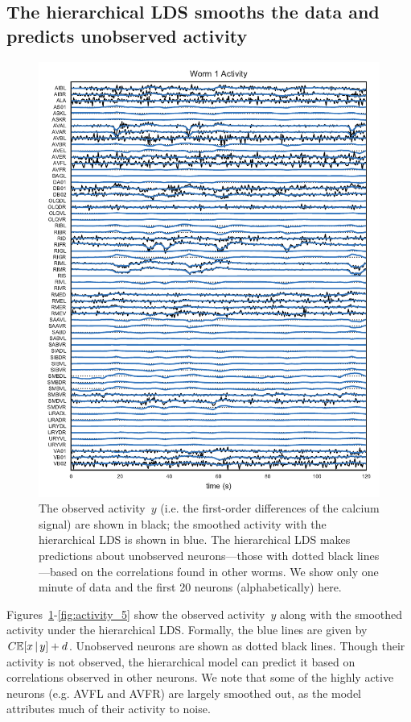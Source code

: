 \documentclass{article}
\begin{document}
\clearpage

\subsection{The hierarchical LDS smooths the data and predicts unobserved activity}


\begin{figure}[h]
  \centering
  \includegraphics[width=5.5in]{figures/lds/y_0}
  \caption{The observed activity~$y$ (i.e. the first-order differences
    of the calcium signal) are shown in black; the smoothed activity
    with the hierarchical LDS is shown in blue.  The hierarchical LDS
    makes predictions about unobserved neurons---those with dotted
    black lines---based on the correlations found in other worms. We
    show only one minute of data and the first 20 neurons
    (alphabetically) here.}
  \label{fig:activity_1}
\end{figure}

Figures~\ref{fig:activity_1}-\ref{fig:activity_5} show the observed
activity~$y$ along with the smoothed activity under the hierarchical
LDS.  Formally, the blue lines are given by~$C \mathbb{E}[x \,|\, y] +
d$. Unobserved neurons are shown as dotted black lines.  Though their
activity is not observed, the hierarchical model can predict it based
on correlations observed in other neurons. We note that some of the
highly active neurons (e.g. \textsf{AVFL} and \textsf{AVFR}) are
largely smoothed out, as the model attributes much of their activity
to noise. 
\end{document}
